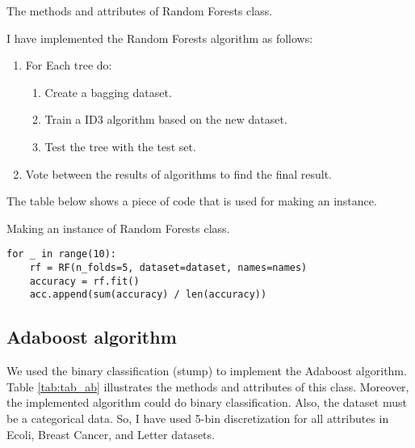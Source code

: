 \begin{table}[H]
\centering
\caption{The methods and attributes of Random Forests class.}
\label{tab:tab_rf}

\end{table}

I have implemented the Random Forests algorithm as follows:
\begin{enumerate}
    \item For Each tree do:
    \begin{enumerate}
        \item Create a bagging dataset.
        \item Train a ID3 algorithm based on the new dataset.
        \item Test the tree with the test set.
    \end{enumerate}
    \item Vote between the results of algorithms to find the final result.
    
\end{enumerate}

The table below shows a piece of code that is used for making an instance. 

\begin{table}[H]
\centering
\caption{Making an instance of Random Forests class.}
\begin{lstlisting}
for _ in range(10):
    rf = RF(n_folds=5, dataset=dataset, names=names)
    accuracy = rf.fit()
    acc.append(sum(accuracy) / len(accuracy))
\end{lstlisting}
\end{table}






\subsection{Adaboost algorithm}
We used the binary classification (stump) to implement the Adaboost algorithm. Table \ref{tab:tab_ab} illustrates the methods and attributes of this class. Moreover, the implemented algorithm could do binary classification. Also, the dataset must be a categorical data. So, I have used 5-bin discretization for all attributes in Ecoli, Breast Cancer, and Letter datasets.

